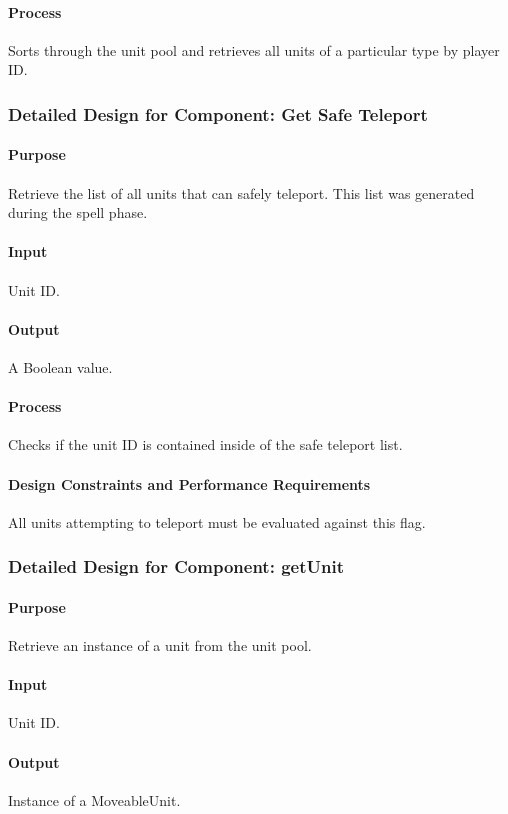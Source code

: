 \documentclass[12pt,a4paper,titlepage]{article}
\begin{document}
\paragraph{Process} Sorts through the unit pool and retrieves all units of a particular type by player ID.

\subsubsection{Detailed Design for Component: Get Safe Teleport}
\paragraph{Purpose} Retrieve the list of all units that can safely teleport. This list was generated during the spell phase.
\paragraph{Input} Unit ID.
\paragraph{Output} A Boolean value.
\paragraph{Process} Checks if the unit ID is contained inside of the safe teleport list.
\paragraph{Design Constraints and Performance Requirements} All units attempting to teleport must be evaluated against this flag.

\subsubsection{Detailed Design for Component: getUnit}
\paragraph{Purpose} Retrieve an instance of a unit from the unit pool.
\paragraph{Input}  Unit ID.
\paragraph{Output} Instance of a MoveableUnit.
\end{document}
